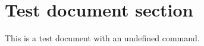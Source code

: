 \documentclass{article}
\begin{document}
\section{Test document section}
This is a test document with an undefined command.

\myundefinedcommand\ 
\end{document}

